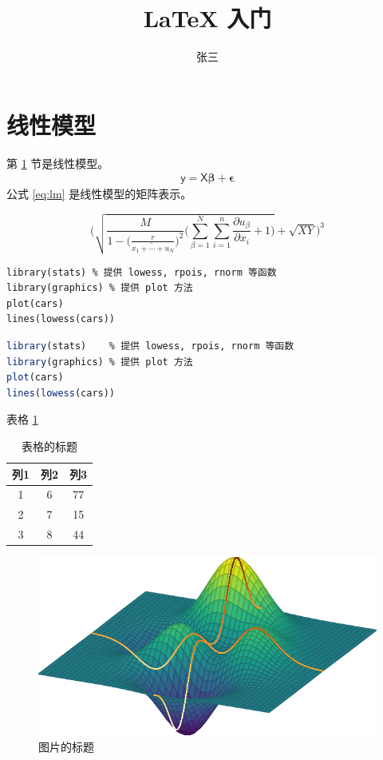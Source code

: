 \documentclass[b5paper]{article}
\title{LaTeX 入门}
\author{张三}
\begin{document}
\maketitle
\tableofcontents
\section{线性模型} \label{sec:lm}
第 \ref{sec:lm} 节是线性模型。
\begin{align} \label{eq:lm}
\bm{\mathsf{y}} = \bm{\mathsf{X}}\bm{\beta} + \bm{\epsilon}
\end{align}
公式 \ref{eq:lm} 是线性模型的矩阵表示。

\[
\Bigg(\sqrt{\frac{M}{1 - \big(\frac{r}{\widetilde{x_1 + \cdots + u_N}} \big)^2} \big(\sum_{\beta =1}^{N} \sum_{i=1}^{n}\frac{\partial u_{\beta}}{\partial x_i} + 1 \big) } + \sqrt{XY} \Bigg)^3
\]

\begin{verbatim}
library(stats) % 提供 lowess, rpois, rnorm 等函数
library(graphics) % 提供 plot 方法
plot(cars)
lines(lowess(cars))
\end{verbatim}

\begin{lstlisting}[language=R]
library(stats)    % 提供 lowess, rpois, rnorm 等函数
library(graphics) % 提供 plot 方法
plot(cars)
lines(lowess(cars))
\end{lstlisting}

表格 \ref{tbl:demo}

\begin{table}[h!]
  \begin{center}
    \begin{tabular}{|c c c|} 
      \hline
      列1 & 列2 & 列3 \\ 
      \hline
      1 & 6 & 77 \\ 
      2 & 7 & 15 \\
      3 & 8 & 44 \\
      \hline
    \end{tabular}
  \caption{表格的标题}
  \label{tbl:demo}
  \end{center}
\end{table}

\begin{figure}[ht]
  \begin{center}
    \includegraphics[width=.75\textwidth]{../images/peaks.png}
    \caption{图片的标题}
    \label{fig:figure}
  \end{center}
\end{figure}
\end{document}
